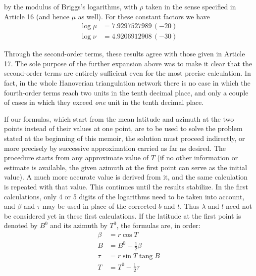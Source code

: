 %
by the modulus of Briggs's logarithms, with \(\rho\) taken in the sense specified in Article 16 (and hence \(\mu\) as well). For these constant factors we have
\[
\begin{aligned}
\log\mu&=7.9297527989\,(-20)\\
\log\nu&=4.9206912908\,(-30)
\end{aligned}
\]

\indent Through the second-order terms, these results agree with those given in Article 17. The sole purpose of the further expansion above was to make it clear that the second-order terms are entirely sufficient even for the most precise calculation. In fact, in the whole Hanoverian triangulation network there is no case in which the fourth-order terms reach two units in the tenth decimal place, and only a couple of cases in which they exceed \textit{one} unit in the tenth decimal place.

If our formulas, which start from the mean latitude and azimuth at the two points instead of their values at one point, are to be used to solve the problem stated at the beginning of this memoir, the solution must proceed indirectly, or more precisely by successive approximation carried as far as desired. The procedure starts from any approximate value of \(T\) (if no other information or estimate is available, the given azimuth at the first point can serve as the initial value). A much more accurate value is derived from it, and the same calculation is repeated with that value. This continues until the results stabilize. In the first calculations, only 4 or 5 digits of the logarithms need to be taken into account, and \(\beta\) and \(\tau\) may be used in place of the corrected \(b\) and \(t\). Thus \(\lambda\) and \(l\) need not be considered yet in these first calculations. If the latitude at the first point is denoted by \(B^0\) and its azimuth by \(T^0\), the formulas are, in order:
\[
\begin{aligned}
\beta&=r\cos T\\
B&=B^0-\tfrac12\beta\\
\tau&=r\sin T\operatorname{tang}B\\
T&=T^0-\tfrac12\tau
\end{aligned}
\]
